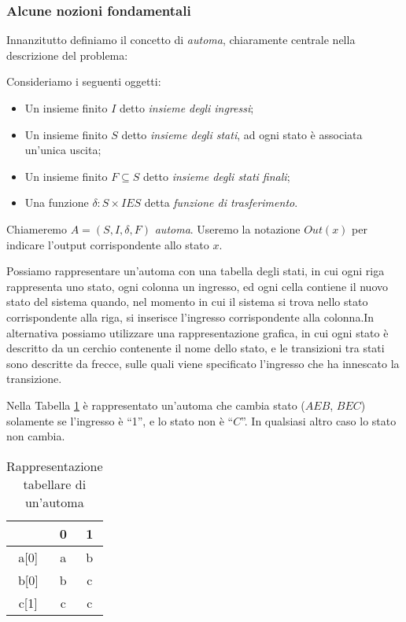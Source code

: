\subsubsection{Alcune nozioni fondamentali}
Innanzitutto definiamo il concetto di \emph{automa}, chiaramente centrale nella descrizione del problema:
\begin{definition}
    Consideriamo i seguenti oggetti:
    \begin{itemize}
        \item Un insieme finito $I$ detto \emph{insieme degli ingressi};
        \item Un insieme finito $S$ detto \emph{insieme degli stati}, ad ogni stato è associata un'unica uscita;
        \item Un insieme finito $F \subseteq S$ detto \emph{insieme degli stati finali};
        \item Una funzione $\delta: S \times I E S$ detta \emph{funzione di trasferimento}.
    \end{itemize}
    Chiameremo $A = (S,I,\delta,F)$ \emph{automa}. Useremo la notazione $Out(x)$ per indicare l'output corrispondente allo stato $x$.
\end{definition}
Possiamo rappresentare un'automa con una tabella degli stati, in cui ogni riga rappresenta uno stato, ogni colonna un ingresso, ed ogni cella contiene il nuovo stato del sistema quando, nel momento in cui il sistema si trova nello stato corrispondente alla riga, si inserisce l'ingresso corrispondente alla colonna.In alternativa possiamo utilizzare una rappresentazione grafica, in cui ogni stato è descritto da un cerchio contenente il nome dello stato, e le transizioni tra stati sono descritte da frecce, sulle quali viene specificato l'ingresso che ha innescato la transizione.\\
\begin{example}
    Nella Tabella \ref{fig:tab_automata} è rappresentato un'automa che cambia stato ($A E B$, $B E C$) solamente se l'ingresso è ``1'', e lo stato non è ``$C$''. In qualsiasi altro caso lo stato non cambia.
    \begin{table}[ht]
        \centering
        \begin{tabular}{ c | c c }
            \hline
            & 0 & 1\\
            \hline
            a[0] & a & b \\
            b[0] & b & c \\
            c[1] & c & c \\
            \hline
          \end{tabular}
        \caption{Rappresentazione tabellare di un'automa}
        \label{fig:tab_automata}
    \end{table}
    \label{exa:automata_tab}
\end{example}
